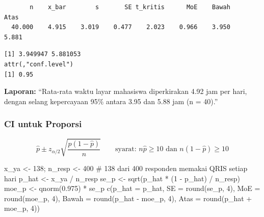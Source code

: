 \documentclass[
  indonesian,
  letterpaper,
]{book}
\newenvironment{Shaded}{\begin{snugshade}}{\end{snugshade}}
\newcommand{\AttributeTok}[1]{\textcolor[rgb]{0.40,0.45,0.13}{#1}}
\newcommand{\CommentTok}[1]{\textcolor[rgb]{0.37,0.37,0.37}{#1}}
\newcommand{\DecValTok}[1]{\textcolor[rgb]{0.68,0.00,0.00}{#1}}
\newcommand{\FloatTok}[1]{\textcolor[rgb]{0.68,0.00,0.00}{#1}}
\newcommand{\FunctionTok}[1]{\textcolor[rgb]{0.28,0.35,0.67}{#1}}
\newcommand{\NormalTok}[1]{\textcolor[rgb]{0.00,0.23,0.31}{#1}}
\newcommand{\OtherTok}[1]{\textcolor[rgb]{0.00,0.23,0.31}{#1}}
\newcommand{\SpecialCharTok}[1]{\textcolor[rgb]{0.37,0.37,0.37}{#1}}
\begin{document}
\begin{verbatim}
       n    x_bar        s       SE t_kritis      MoE    Bawah     Atas 
  40.000    4.915    3.019    0.477    2.023    0.966    3.950    5.881 
\end{verbatim}

\begin{Shaded}
\end{Shaded}

\begin{verbatim}
[1] 3.949947 5.881053
attr(,"conf.level")
[1] 0.95
\end{verbatim}

\textbf{Laporan:} ``Rata-rata waktu layar mahasiswa diperkirakan 4.92
jam per hari, dengan selang kepercayaan 95\% antara 3.95 dan 5.88 jam (n
= 40).''

\subsubsection{\texorpdfstring{\textbf{CI untuk
Proporsi}}{CI untuk Proporsi}}\label{ci-untuk-proporsi}

\[\hat{p} \pm z_{\alpha/2}\sqrt{\frac{\hat{p}(1-\hat{p})}{n}} \qquad \text{syarat: } n\hat{p} \geq 10 \text{ dan } n(1-\hat{p}) \geq 10\]

\begin{Shaded}
\begin{Highlighting}[]
\NormalTok{x\_ya }\OtherTok{\textless{}{-}} \DecValTok{138}\NormalTok{; n\_resp }\OtherTok{\textless{}{-}} \DecValTok{400}    \CommentTok{\# 138 dari 400 responden memakai QRIS setiap hari}
\NormalTok{p\_hat }\OtherTok{\textless{}{-}}\NormalTok{ x\_ya }\SpecialCharTok{/}\NormalTok{ n\_resp}
\NormalTok{se\_p  }\OtherTok{\textless{}{-}} \FunctionTok{sqrt}\NormalTok{(p\_hat }\SpecialCharTok{*}\NormalTok{ (}\DecValTok{1} \SpecialCharTok{{-}}\NormalTok{ p\_hat) }\SpecialCharTok{/}\NormalTok{ n\_resp)}
\NormalTok{moe\_p }\OtherTok{\textless{}{-}} \FunctionTok{qnorm}\NormalTok{(}\FloatTok{0.975}\NormalTok{) }\SpecialCharTok{*}\NormalTok{ se\_p}
\FunctionTok{c}\NormalTok{(}\AttributeTok{p\_hat =}\NormalTok{ p\_hat, }\AttributeTok{SE =} \FunctionTok{round}\NormalTok{(se\_p, }\DecValTok{4}\NormalTok{), }\AttributeTok{MoE =} \FunctionTok{round}\NormalTok{(moe\_p, }\DecValTok{4}\NormalTok{),}
  \AttributeTok{Bawah =} \FunctionTok{round}\NormalTok{(p\_hat }\SpecialCharTok{{-}}\NormalTok{ moe\_p, }\DecValTok{4}\NormalTok{), }\AttributeTok{Atas =} \FunctionTok{round}\NormalTok{(p\_hat }\SpecialCharTok{+}\NormalTok{ moe\_p, }\DecValTok{4}\NormalTok{))}
\end{Highlighting}
\end{Shaded}
\end{document}
